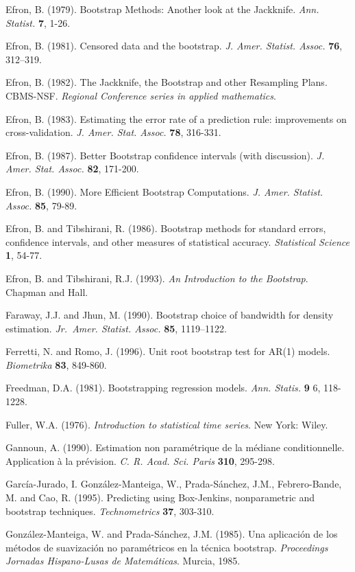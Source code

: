 \documentclass[
]{book}
\theoremstyle{definition}
\theoremstyle{definition}
\theoremstyle{definition}
\theoremstyle{remark}
\begin{document}
Efron, B. (1979). Bootstrap Methods: Another look at the Jackknife.
\emph{Ann. Statist.} \textbf{7}, 1-26.

Efron, B. (1981). Censored data and the bootstrap.
\emph{J. Amer. Statist. Assoc.} \textbf{76}, 312--319.

Efron, B. (1982). The Jackknife, the Bootstrap and other Resampling
Plans. CBMS-NSF. \emph{Regional Conference series in applied mathematics}.

Efron, B. (1983). Estimating the error rate of a prediction rule:
improvements on cross-validation. \emph{J. Amer. Stat. Assoc.} \textbf{78}, 316-331.

Efron, B. (1987). Better Bootstrap confidence intervals (with
discussion). \emph{J. Amer. Stat. Assoc.} \textbf{82}, 171-200.

Efron, B. (1990). More Efficient Bootstrap Computations.
\emph{J. Amer. Statist. Assoc.} \textbf{85}, 79-89.

Efron, B. and Tibshirani, R. (1986). Bootstrap methods for standard
errors, confidence intervals, and other measures of statistical
accuracy. \emph{Statistical Science} \textbf{1}, 54-77.

Efron, B. and Tibshirani, R.J. (1993). \emph{An Introduction to the Bootstrap}.
Chapman and Hall.

Faraway, J.J. and Jhun, M. (1990). Bootstrap choice of bandwidth for
density estimation. \emph{Jr.~Amer. Statist. Assoc.} \textbf{85}, 1119--1122.

Ferretti, N. and Romo, J. (1996). Unit root bootstrap test for AR(1)
models. \emph{Biometrika} \textbf{83}, 849-860.

Freedman, D.A. (1981). Bootstrapping regression models.
\emph{Ann. Statis.} \textbf{9} 6, 118-1228.

Fuller, W.A. (1976). \emph{Introduction to statistical time series}. New York:
Wiley.

Gannoun, A. (1990). Estimation non paramétrique de la médiane
conditionnelle. Application à la prévision. \emph{C. R. Acad. Sci. Paris}
\textbf{310}, 295-298.

García-Jurado, I. González-Manteiga, W., Prada-Sánchez, J.M.,
Febrero-Bande, M. and Cao, R. (1995). Predicting using Box-Jenkins,
nonparametric and bootstrap techniques. \emph{Technometrics} \textbf{37}, 303-310.

González-Manteiga, W. and Prada-Sánchez, J.M. (1985). Una aplicación de
los métodos de suavización no paramétricos en la técnica bootstrap.
\emph{Proceedings Jornadas Hispano-Lusas de Matemáticas}. Murcia, 1985.
\end{document}
